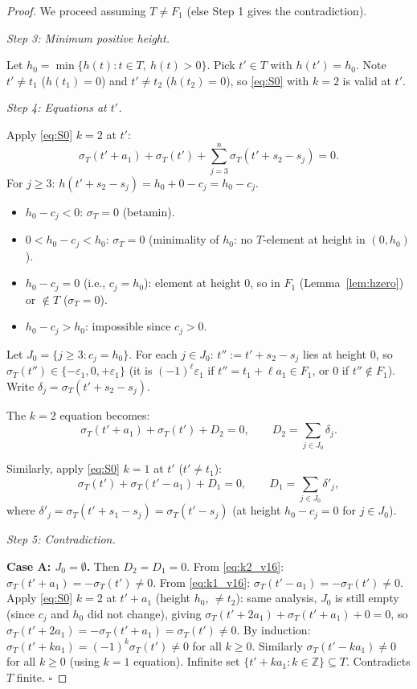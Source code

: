 \begin{proof}
We proceed assuming $T \neq F_1$ (else Step 1 gives the contradiction).

\medskip
\noindent\textit{Step 3: Minimum positive height.}

Let $h_0 = \min\{h(t) : t \in T,\ h(t) > 0\}$.  Pick $t' \in T$ with $h(t') = h_0$.
Note $t' \neq t_1$ ($h(t_1)=0$) and $t' \neq t_2$ ($h(t_2)=0$), so \eqref{eq:S0}
with $k=2$ is valid at $t'$.

\medskip
\noindent\textit{Step 4: Equations at $t'$.}

Apply \eqref{eq:S0} $k=2$ at $t'$:
\[
  \sigma_T(t' + a_1) + \sigma_T(t') + \sum_{j=3}^n \sigma_T(t' + s_2 - s_j) = 0.
\]
For $j \geq 3$: $h(t' + s_2 - s_j) = h_0 + 0 - c_j = h_0 - c_j$.
\begin{itemize}
\item $h_0 - c_j < 0$: $\sigma_T = 0$ (betamin).
\item $0 < h_0 - c_j < h_0$: $\sigma_T = 0$ (minimality of $h_0$: no $T$-element at height in $(0,h_0)$).
\item $h_0 - c_j = 0$ (i.e., $c_j = h_0$): element at height $0$, so in $F_1$ (Lemma~\ref{lem:hzero}) or $\notin T$ ($\sigma_T = 0$).
\item $h_0 - c_j > h_0$: impossible since $c_j > 0$.
\end{itemize}

Let $J_0 = \{j \geq 3 : c_j = h_0\}$.  For each $j \in J_0$:
$t'' := t' + s_2 - s_j$ lies at height $0$, so $\sigma_T(t'') \in \{-\varepsilon_1, 0, +\varepsilon_1\}$
(it is $(-1)^\ell \varepsilon_1$ if $t'' = t_1 + \ell a_1 \in F_1$, or $0$ if $t'' \notin F_1$).
Write $\delta_j = \sigma_T(t' + s_2 - s_j)$.

The $k=2$ equation becomes:
\begin{equation}\label{eq:k2_v16}
  \sigma_T(t' + a_1) + \sigma_T(t') + D_2 = 0, \qquad D_2 = \sum_{j \in J_0} \delta_j.
\end{equation}

Similarly, apply \eqref{eq:S0} $k=1$ at $t'$ ($t' \neq t_1$):
\begin{equation}\label{eq:k1_v16}
  \sigma_T(t') + \sigma_T(t' - a_1) + D_1 = 0, \qquad D_1 = \sum_{j \in J_0} \delta'_j,
\end{equation}
where $\delta'_j = \sigma_T(t' + s_1 - s_j) = \sigma_T(t' - s_j)$ (at height $h_0 - c_j = 0$
for $j \in J_0$).

\medskip
\noindent\textit{Step 5: Contradiction.}

\textbf{Case A: $J_0 = \emptyset$.}
Then $D_2 = D_1 = 0$.  From \eqref{eq:k2_v16}: $\sigma_T(t'+a_1) = -\sigma_T(t') \neq 0$.
From \eqref{eq:k1_v16}: $\sigma_T(t'-a_1) = -\sigma_T(t') \neq 0$.
Apply \eqref{eq:S0} $k=2$ at $t' + a_1$ (height $h_0$, $\neq t_2$): same analysis, $J_0$
is still empty (since $c_j$ and $h_0$ did not change), giving
$\sigma_T(t'+2a_1) + \sigma_T(t'+a_1) + 0 = 0$, so $\sigma_T(t'+2a_1) = -\sigma_T(t'+a_1) = \sigma_T(t') \neq 0$.
By induction: $\sigma_T(t' + k a_1) = (-1)^k \sigma_T(t') \neq 0$ for all $k \geq 0$.
Similarly $\sigma_T(t' - k a_1) \neq 0$ for all $k \geq 0$ (using $k=1$ equation).
Infinite set $\{t' + k a_1 : k \in \mathbb{Z}\} \subseteq T$. Contradicts $T$ finite. $\square$


\end{proof}
